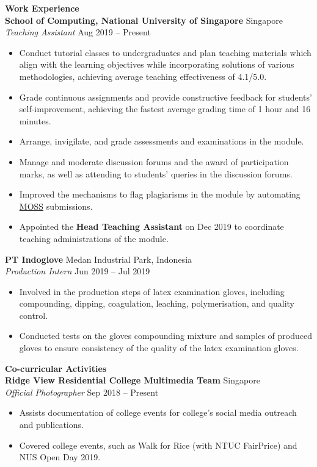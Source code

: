 \documentclass[a4paper, 11pt]{article}
\newcommand{\interspace}{\vspace{10pt}}
\newcommand{\intraspace}{\vspace{5pt}}
\begin{document}
	\textbf{\large Work Experience} \hrulefill \\
	\textbf{School of Computing, National University of Singapore} \hfill Singapore\\
	\textit{Teaching Assistant} \hfill Aug 2019 -- Present
	\begin{itemize}[leftmargin=*, noitemsep, topsep=0pt]
		\item Conduct tutorial classes to undergraduates and plan teaching materials which align with the learning objectives while incorporating solutions of various methodologies, achieving average teaching effectiveness of 4.1/5.0.
		\item Grade continuous assignments and provide constructive feedback for students’ self-improvement, achieving the fastest average grading time of 1 hour and 16 minutes.
		\item Arrange, invigilate, and grade assessments and examinations in the module.
		\item Manage and moderate discussion forums and the award of participation marks, as well as attending to students’ queries in the discussion forums.
		\item Improved the mechanisms to flag plagiarisms in the module by automating \href{http://theory.stanford.edu/~aiken/moss/}{MOSS} submissions.
		\item Appointed the \textbf{Head Teaching Assistant} on Dec 2019 to coordinate teaching administrations of the module.
	\end{itemize}
	
	\intraspace
	
	\textbf{PT Indoglove} \hfill Medan Industrial Park, Indonesia\\
	\textit{Production Intern} \hfill Jun 2019 -- Jul 2019
	\begin{itemize}[leftmargin=*, noitemsep, topsep=0pt]
		\item Involved in the production steps of latex examination gloves, including compounding, dipping, coagulation, leaching, polymerisation, and quality control.
		\item Conducted tests on the gloves compounding mixture and samples of produced gloves to ensure consistency of the quality of the latex examination gloves.
	\end{itemize}
	
	\interspace
	
	\textbf{\large Co-curricular Activities} \hrulefill \\
	\textbf{Ridge View Residential College Multimedia Team} \hfill Singapore\\
	\textit{Official Photographer} \hfill Sep 2018 -- Present
	\begin{itemize}[leftmargin=*, noitemsep, topsep=0pt]
		\item Assists documentation of college events for college’s social media outreach and publications.
		\item Covered college events, such as Walk for Rice (with NTUC FairPrice) and NUS Open Day 2019.
	\end{itemize}
	\intraspace
	
\end{document}
